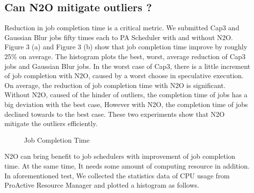 \subsection{Can N2O mitigate outliers ?}

Reduction in job completion time is a critical metric. We submitted Cap3 and Gaussian Blur jobs fifty times each to PA Scheduler with and without N2O. Figure 3 (a) and Figure 3 (b) show that job completion time improve by roughly 25\% on average. The histogram plots the best, worst, average reduction of Cap3 jobs and Gaussian Blur jobs. In the worst case of Cap3, there is a little increment of job completion with N2O, caused by a worst choose in speculative execution. On average, the reduction of job completion time with N2O is significant. Without N2O, caused of the hinder of outliers, the completion time of jobs has a big deviation with the best case, However with N2O, the completion time of jobs declined towards to the best case. These two experiments show that N2O mitigate the outliers efficiently.

\begin{figure}
\centering
{}
\caption{Job Completion Time}
\label{figure:completiontime}
\end{figure}

N2O can bring benefit to job schedulers with improvement of job completion time. At the same time, It needs some amount of computing resource in addition. In aforementioned test, We collected the statistics data of CPU usage from ProActive Resource Manager and plotted a histogram as follows.

